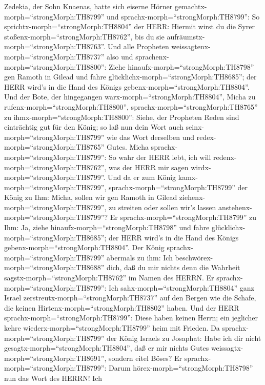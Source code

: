Zedekia, der Sohn Knaenas, hatte sich eiserne Hörner
gemachtx-morph=``strongMorph:TH8799'' und
sprachx-morph=``strongMorph:TH8799'': So
sprichtx-morph=``strongMorph:TH8804'' der HERR: Hiermit wirst du die
Syrer stoßenx-morph=``strongMorph:TH8762'', bis du sie
aufräumstx-morph=``strongMorph:TH8763''.  Und alle
Propheten weissagtenx-morph=``strongMorph:TH8737'' also und
sprachenx-morph=``strongMorph:TH8800'': Ziehe
hinaufx-morph=``strongMorph:TH8798'' gen Ramoth in Gilead und fahre
glücklichx-morph=``strongMorph:TH8685''; der HERR wird's in die Hand des
Königs gebenx-morph=``strongMorph:TH8804''.  Und der Bote,
der hingegangen warx-morph=``strongMorph:TH8804'', Micha zu
rufenx-morph=``strongMorph:TH8800'',
sprachx-morph=``strongMorph:TH8765'' zu
ihmx-morph=``strongMorph:TH8800'': Siehe, der Propheten Reden sind
einträchtig gut für den König; so laß nun dein Wort auch
seinx-morph=``strongMorph:TH8799'' wie das Wort derselben und
redex-morph=``strongMorph:TH8765'' Gutes.  Micha
sprachx-morph=``strongMorph:TH8799'': So wahr der HERR lebt, ich will
redenx-morph=``strongMorph:TH8762'', was der HERR mir sagen
wirdx-morph=``strongMorph:TH8799''.  Und da er zum König
kamx-morph=``strongMorph:TH8799'', sprachx-morph=``strongMorph:TH8799''
der König zu Ihm: Micha, sollen wir gen Ramoth in Gilead
ziehenx-morph=``strongMorph:TH8799'', zu streiten oder sollen wir's
lassen anstehenx-morph=``strongMorph:TH8799''? Er
sprachx-morph=``strongMorph:TH8799'' zu Ihm: Ja, ziehe
hinaufx-morph=``strongMorph:TH8798'' und fahre
glücklichx-morph=``strongMorph:TH8685''; der HERR wird's in die Hand des
Königs gebenx-morph=``strongMorph:TH8804''.  Der König
sprachx-morph=``strongMorph:TH8799'' abermals zu ihm: Ich
beschwörex-morph=``strongMorph:TH8688'' dich, daß du mir nichts denn die
Wahrheit sagstx-morph=``strongMorph:TH8762'' im Namen des HERRN.
 Er sprachx-morph=``strongMorph:TH8799'': Ich
sahx-morph=``strongMorph:TH8804'' ganz Israel
zerstreutx-morph=``strongMorph:TH8737'' auf den Bergen wie die Schafe,
die keinen Hirtenx-morph=``strongMorph:TH8802'' haben. Und der HERR
sprachx-morph=``strongMorph:TH8799'': Diese haben keinen Herrn; ein
jeglicher kehre wiederx-morph=``strongMorph:TH8799'' heim mit Frieden.
 Da sprachx-morph=``strongMorph:TH8799'' der König Israels
zu Josaphat: Habe ich dir nicht gesagtx-morph=``strongMorph:TH8804'',
daß er mir nichts Gutes weissagtx-morph=``strongMorph:TH8691'', sondern
eitel Böses?  Er sprachx-morph=``strongMorph:TH8799'':
Darum hörex-morph=``strongMorph:TH8798'' nun das Wort des HERRN! Ich
